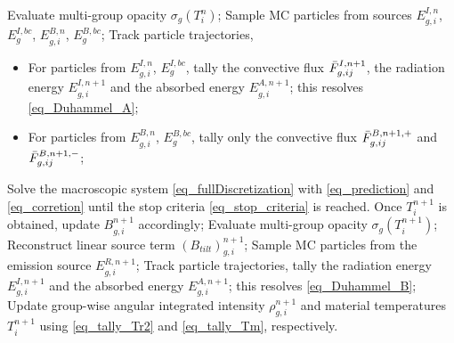 \documentclass[preprint,12pt]{elsarticle}
\theoremstyle{definition}
\theoremstyle{plain}
\numberwithin{equation}{section}
\numberwithin{algorithm}{section}
\newcounter{eq_count}
\newcounter{thm_count}
\newcounter{alg_count}
\newcommand{\half}{\frac{1}{2}}
\begin{document}
\begin{algorithm}[H]
	\caption{The updating procedure from $t^n$ to $t^{n+1}$.}
	\label{eq_algorithm}
	\begin{algorithmic}[1]
		\STATE Evaluate multi-group opacity $\sigma_g(T^n_i)$;
		\STATE Sample MC particles from sources $ E_{g,i}^{I,n}$, $ E_{g}^{I,bc}$, $ E_{g,i}^{B,n}$, $ E_{g}^{B,bc}$;
		\STATE Track particle trajectories,
		\begin{itemize}
			\item For particles from $ E_{g,i}^{I,n}$, $ E_{g}^{I,bc}$, tally the convective flux $\Bar{F}_{g,ij}^{I,n+1}$, the radiation energy $E_{g,i}^{I,n+1}$ and the absorbed energy $E_{g,i}^{A,n+1} $; this resolves \eqref{eq_Duhammel_A};
			\item For particles from $ E_{g,i}^{B,n}$, $ E_{g}^{B,bc}$, tally only the convective flux $\Bar{F}_{g,ij}^{B,n+1,+}$ and $\Bar{F}_{g,ij}^{B,n+1,-}$;
		\end{itemize}
		\STATE Solve the macroscopic system \eqref{eq_fullDiscretization} with 
    	\eqref{eq_prediction} and \eqref{eq_corretion} until the stop criteria \eqref{eq_stop_criteria} is reached. Once $T_i^{n+1}$ is obtained, update $B_{g,i}^{n+1}$ accordingly;
		\STATE Evaluate multi-group opacity $\sigma_g(T^{n+1}_i)$;
		\STATE Reconstruct linear source term  $(B_{tilt})_{g,i}^{n+1}$;
		\STATE Sample MC particles from the emission source $E_{g,i}^{R,n+1}$;
		\STATE Track particle trajectories, tally the radiation energy $E_{g,i}^{I,n+1}$ and the absorbed energy $E_{g,i}^{A,n+1} $; this resolves \eqref{eq_Duhammel_B};
		\STATE Update group-wise angular integrated intensity $\rho_{g,i}^{n+1}$ and material temperatures $T_i^{n+1}$ using \eqref{eq_tally_Tr2} and \eqref{eq_tally_Tm}, respectively.
	\end{algorithmic}
\end{algorithm}



\end{document}
